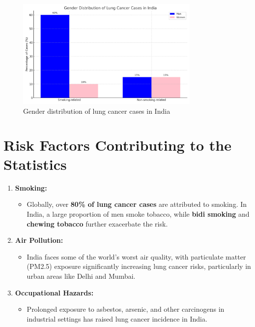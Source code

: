 \begin{figure}[h!]
    \centering
    \includegraphics[width=0.8\textwidth]{images/lung_cancer_gender_distribution_chart.png}
    \caption{Gender distribution of lung cancer cases in India}
    \label{fig:gender_distribution}
\end{figure}

\section{Risk Factors Contributing to the Statistics}
\begin{highlight}
\begin{enumerate}
    \item \textbf{Smoking:}
    \begin{itemize}
        \item Globally, over \textbf{80\% of lung cancer cases} are attributed to smoking. In India, a large proportion of men smoke tobacco, while \textbf{bidi smoking} and \textbf{chewing tobacco} further exacerbate the risk.
    \end{itemize}
    \item \textbf{Air Pollution:}
    \begin{itemize}
        \item India faces some of the world's worst air quality, with particulate matter (PM2.5) exposure significantly increasing lung cancer risks, particularly in urban areas like Delhi and Mumbai.
    \end{itemize}
    \item \textbf{Occupational Hazards:}
    \begin{itemize}
        \item Prolonged exposure to asbestos, arsenic, and other carcinogens in industrial settings has raised lung cancer incidence in India.
    \end{itemize}
\end{enumerate}
\end{highlight}

